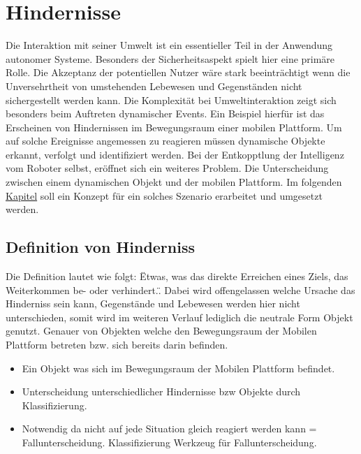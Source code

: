 
	\chapter{Hindernisse}
	Die Interaktion mit seiner Umwelt ist ein essentieller Teil in der Anwendung autonomer Systeme. Besonders der Sicherheitsaspekt spielt hier eine primäre Rolle. Die Akzeptanz der potentiellen Nutzer wäre stark beeinträchtigt wenn die Unversehrtheit von umstehenden Lebewesen und Gegenständen nicht sichergestellt werden kann. Die Komplexität bei Umweltinteraktion zeigt sich besonders beim Auftreten dynamischer Events. Ein Beispiel hierfür ist das Erscheinen von Hindernissen im Bewegungsraum einer mobilen Plattform. Um auf solche Ereignisse angemessen zu reagieren müssen dynamische Objekte erkannt, verfolgt und identifiziert werden. Bei der Entkopptlung der Intelligenz vom Roboter selbst, eröffnet sich ein weiteres Problem. Die Unterscheidung zwischen einem dynamischen Objekt und der mobilen Plattform. Im folgenden \underline{Kapitel} soll ein Konzept für ein solches Szenario erarbeitet und umgesetzt werden.
		\section{Definition von Hinderniss}
		Die Definition lautet wie folgt: \"Etwas, was das direkte Erreichen eines Ziels, das Weiterkommen be- oder verhindert.\". \cite{duden-hinderniss} Dabei wird offengelassen welche Ursache das Hinderniss sein kann, Gegenstände und Lebewesen werden hier nicht unterschieden, somit wird im weiteren Verlauf lediglich die neutrale Form Objekt genutzt. Genauer von Objekten welche den Bewegungsraum der Mobilen Plattform betreten bzw. sich bereits darin befinden.
		\begin{itemize}
		\item Ein Objekt was sich im Bewegungsraum der Mobilen Plattform befindet.
		\item Unterscheidung unterschiedlicher Hindernisse bzw Objekte durch Klassifizierung.
		\item Notwendig da nicht auf jede Situation gleich reagiert werden kann = Fallunterscheidung. Klassifizierung Werkzeug für Fallunterscheidung.
		\end{itemize}
		
